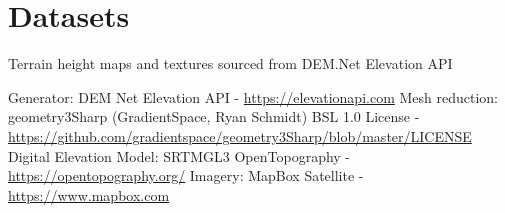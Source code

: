 \documentclass[sigconf,authordraft]{acmart}
\begin{document}
\section*{Datasets}

Terrain height maps and textures sourced from DEM.Net Elevation API

Generator: DEM Net Elevation API -
\url{https://elevationapi.com}
Mesh reduction: geometry3Sharp (GradientSpace, Ryan Schmidt) BSL 1.0 License -
\url{https://github.com/gradientspace/geometry3Sharp/blob/master/LICENSE}
Digital Elevation Model: SRTM\textunderscore{}GL3 OpenTopography -
\url{https://opentopography.org/}
Imagery: MapBox Satellite -
\url{https://www.mapbox.com}




\appendix
\end{document}
